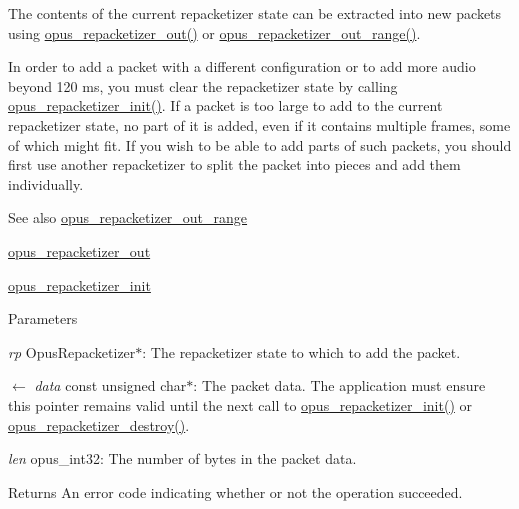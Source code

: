 The contents of the current repacketizer state can be extracted into new packets using \hyperlink{group__opus__repacketizer_ga19ff1e91a8fa652380f972a224a26481}{opus\_\-repacketizer\_\-out()} or \hyperlink{group__opus__repacketizer_gac591b550d92125b4abfa11a4b609f51f}{opus\_\-repacketizer\_\-out\_\-range()}.

In order to add a packet with a different configuration or to add more audio beyond 120 ms, you must clear the repacketizer state by calling \hyperlink{group__opus__repacketizer_gab42ff7c3f8a49ff5029fcf60f3b853f0}{opus\_\-repacketizer\_\-init()}. If a packet is too large to add to the current repacketizer state, no part of it is added, even if it contains multiple frames, some of which might fit. If you wish to be able to add parts of such packets, you should first use another repacketizer to split the packet into pieces and add them individually. \begin{DoxySeeAlso}{See also}
\hyperlink{group__opus__repacketizer_gac591b550d92125b4abfa11a4b609f51f}{opus\_\-repacketizer\_\-out\_\-range} 

\hyperlink{group__opus__repacketizer_ga19ff1e91a8fa652380f972a224a26481}{opus\_\-repacketizer\_\-out} 

\hyperlink{group__opus__repacketizer_gab42ff7c3f8a49ff5029fcf60f3b853f0}{opus\_\-repacketizer\_\-init} 
\end{DoxySeeAlso}

\begin{DoxyParams}{Parameters}
\item[{\em rp}]{\ttfamily OpusRepacketizer$\ast$}: The repacketizer state to which to add the packet. \item[\mbox{$\leftarrow$} {\em data}]{\ttfamily const unsigned char$\ast$}: The packet data. The application must ensure this pointer remains valid until the next call to \hyperlink{group__opus__repacketizer_gab42ff7c3f8a49ff5029fcf60f3b853f0}{opus\_\-repacketizer\_\-init()} or \hyperlink{group__opus__repacketizer_gadb08b25d2a29a559c35774cfe2a1b886}{opus\_\-repacketizer\_\-destroy()}. \item[{\em len}]{\ttfamily opus\_\-int32}: The number of bytes in the packet data. \end{DoxyParams}
\begin{DoxyReturn}{Returns}
An error code indicating whether or not the operation succeeded. 
\end{DoxyReturn}


